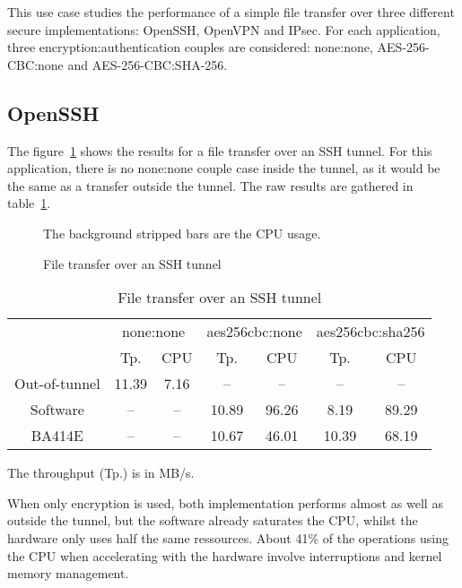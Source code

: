 This use case studies the performance of a simple file transfer over three different secure implementations: OpenSSH, OpenVPN and IPsec.
For each application, three encryption:authentication couples are considered: none:none, AES-256-CBC:none and AES-256-CBC:SHA-256. 

\subsection{OpenSSH}
The figure~\ref{fig:openssh-bench} shows the results for a file transfer over an SSH tunnel.
For this application, there is no none:none couple case inside the tunnel, as it would be the same as a transfer outside the tunnel.
The raw results are gathered in table~\ref{tab:openssh-bench}.

\begin{figure}[ht]

\caption{File transfer over an SSH tunnel}{The background stripped bars are the CPU usage.}
\label{fig:openssh-bench}
\end{figure}

\begin{table}[ht]
\center
\small
\begin{tabular}{l|c|c|c|c|c|c|} \cline{2-7}
 & \multicolumn{2}{c|}{none:none} & \multicolumn{2}{c|}{aes256cbc:none} & \multicolumn{2}{c|}{aes256cbc:sha256} \\ \cline{2-7}
 & Tp.  & CPU & Tp.  & CPU & Tp.  & CPU \\ \hline
\multicolumn{1}{|c|}{Out-of-tunnel} & 11.39 & 7.16 & -- & -- & -- &  -- \\ \hline
\multicolumn{1}{|c|}{Software} & -- & -- & 10.89 & 96.26 & 8.19 &  89.29 \\ \hline
\multicolumn{1}{|c|}{BA414E} & -- & -- & 10.67 & 46.01 & 10.39 & 68.19 \\ \hline
\end{tabular}
\caption{File transfer over an SSH tunnel}{The throughput (Tp.) is in MB/s.}
\label{tab:openssh-bench}
\end{table}

When only encryption is used, both implementation performs almost as well as outside the tunnel, but the software already saturates the CPU, whilst the hardware only uses half the same ressources.
About 41\% of the operations using the CPU when accelerating with the hardware involve interruptions and kernel memory management.

